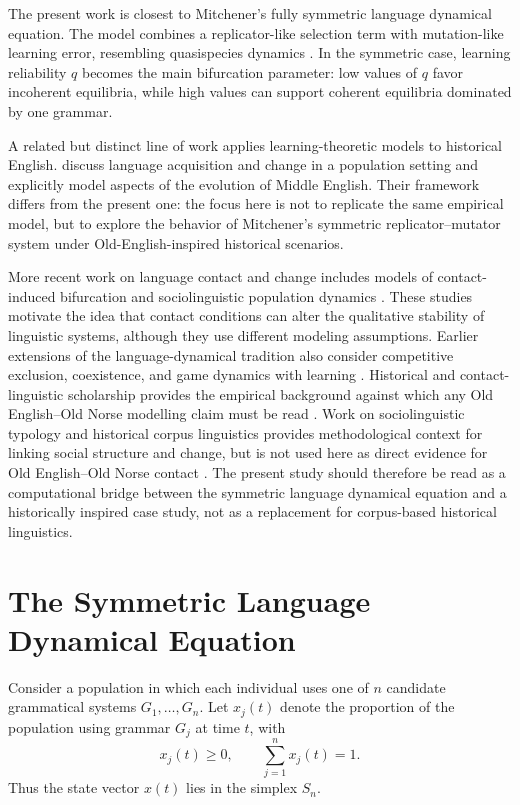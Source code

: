 \documentclass[11pt]{article}
\begin{document}
The present work is closest to Mitchener's fully symmetric language dynamical equation. The model combines a replicator-like selection term with mutation-like learning error, resembling quasispecies dynamics \citep{eigen1971selforganization}. In the symmetric case, learning reliability $q$ becomes the main bifurcation parameter: low values of $q$ favor incoherent equilibria, while high values can support coherent equilibria dominated by one grammar.

A related but distinct line of work applies learning-theoretic models to historical English. \citet{niyogi2009proper} discuss language acquisition and change in a population setting and explicitly model aspects of the evolution of Middle English. Their framework differs from the present one: the focus here is not to replicate the same empirical model, but to explore the behavior of Mitchener's symmetric replicator--mutator system under Old-English-inspired historical scenarios.

More recent work on language contact and change includes models of contact-induced bifurcation and sociolinguistic population dynamics \citep{kauhanen2021replicator,kauhanen2022bifurcation}. These studies motivate the idea that contact conditions can alter the qualitative stability of linguistic systems, although they use different modeling assumptions. Earlier extensions of the language-dynamical tradition also consider competitive exclusion, coexistence, and game dynamics with learning \citep{mitchenernowak2003competitive,mitchener2007game}. Historical and contact-linguistic scholarship provides the empirical background against which any Old English--Old Norse modelling claim must be read \citep{thomasonkaufman1988contact,townend2002language,pons-sanz2013lexical,dawson2003defining,warner2017english}. Work on sociolinguistic typology and historical corpus linguistics provides methodological context for linking social structure and change, but is not used here as direct evidence for Old English--Old Norse contact \citep{walkden2023sociolinguistic}. The present study should therefore be read as a computational bridge between the symmetric language dynamical equation and a historically inspired case study, not as a replacement for corpus-based historical linguistics.

\section{The Symmetric Language Dynamical Equation}

Consider a population in which each individual uses one of $n$ candidate grammatical systems $G_1,\ldots,G_n$. Let $x_j(t)$ denote the proportion of the population using grammar $G_j$ at time $t$, with
\[
    x_j(t)\geq 0, \qquad \sum_{j=1}^n x_j(t)=1.
\]
Thus the state vector $x(t)$ lies in the simplex $S_n$.
\end{document}
